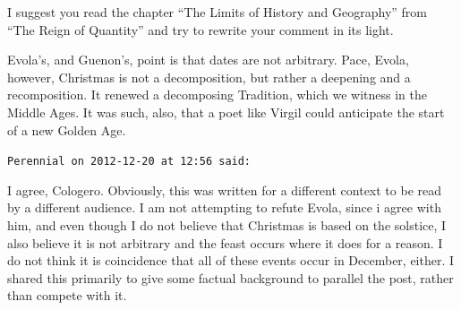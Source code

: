 \begin{footnotesize}
\begin{sffamily}
I suggest you read the chapter ``The Limits of History and Geography'' from ``The Reign of Quantity'' and try to rewrite your comment in its light.

Evola's, and Guenon's, point is that dates are not arbitrary. Pace, Evola, however, Christmas is not a decomposition, but rather a deepening and a recomposition. It renewed a decomposing Tradition, which we witness in the Middle Ages. It was such, also, that a poet like Virgil could anticipate the start of a new Golden Age.

\hfill

\texttt{Perennial on 2012-12-20 at 12:56 said:}

I agree, Cologero. Obviously, this was written for a different context to be read by a different audience. I am not attempting to refute Evola, since i agree with him, and even though I do not believe that Christmas is based on the solstice, I also believe it is not arbitrary and the feast occurs where it does for a reason. I do not think it is coincidence that all of these events occur in December, either. I shared this primarily to give some factual background to parallel the post, rather than compete with it.

\hfill

\end{sffamily}
\end{footnotesize}


